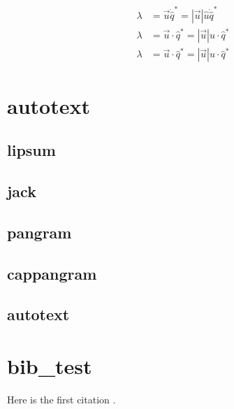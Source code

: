 \documentclass{article}
\begin{document}
\begin{align*}
\lambda &= \vec{u} \dot \hat{q}^* = |\vec{u}| \hat{u} \dot \hat{q}^*\\
\lambda &= \vec{u} \cdot \hat{q}^* = |\vec{u}| \hat{u} \cdot \hat{q}^*\\
\lambda &= \vec{u} \cdot \hat{q}^* = |\vec{u}| \hat{u} \cdot \hat{q}^*   
\end{align*}


\section{autotext}
\subsection{lipsum}
\lipsum
\subsection{jack}
\subsection{pangram}
\subsection{cappangram}
\subsection{autotext}

\section{bib\_test}
Here is the first citation \citet[Eq.~4]{Lighthall_2010}.	    %
 



\end{document}
